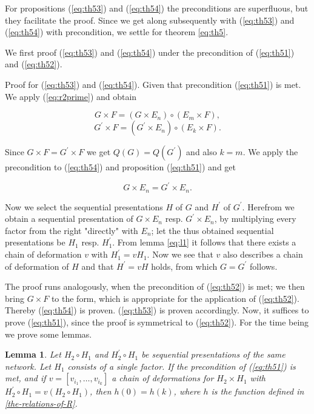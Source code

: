 \documentclass{article}
\newtheorem{lemma}{Lemma}
\begin{document}
For propositions (\ref{eq:th53}) and (\ref{eq:th54}) the preconditions are superfluous, but they facilitate the proof. Since we get along subsequently with (\ref{eq:th53}) and (\ref{eq:th54}) with precondition, we settle for theorem \ref{eq:th5}.

We first proof (\ref{eq:th53}) and (\ref{eq:th54}) under the precondition of (\ref{eq:th51}) and (\ref{eq:th52}).

Proof for (\ref{eq:th53}) and (\ref{eq:th54}). Given that precondition (\ref{eq:th51}) is met. We apply (\ref{eq:r2prime}) and obtain

\begin{equation*} G \times F = (G \times E_n) \circ (E_m \times F), \end{equation*}
\begin{equation*} G^{\prime} \times F = (G^{\prime} \times E_n) \circ (E_k \times F). \end{equation*}

Since $G \times F = G^{\prime} \times F$ we get $Q(G) = Q(G^{\prime})$ and also $k = m$. We apply the precondition to (\ref{eq:th54}) and proposition (\ref{eq:th51}) and get

\[ G \times E_n = G^{\prime} \times E_n. \]

Now we select the sequential presentations $H$ of $G$ and $H^{\prime}$ of $G^{\prime}$. 
Herefrom we obtain a sequential presentation of $G \times E_n$ resp. $G^{\prime} \times E_n$, 
by multiplying every factor from the right "directly" with $E_n$; let the thus obtained sequential presentations be $H_1$ resp. 
$H^{\prime}_1$. From lemma \ref{eq:l1} it follows that there exists a chain of deformation $v$ with $H^{\prime}_1=vH_1$.
Now we see that $v$ also describes a chain of deformation of $H$ and that $H^{\prime}=vH$ holds, from which $G = G^{\prime}$ follows.

The proof runs analogously, when the precondition of (\ref{eq:th52}) is met; 
we then bring $G \times F$ to the form, which is appropriate for the application of (\ref{eq:th52}). 
Thereby (\ref{eq:th54}) is proven. (\ref{eq:th53}) is proven accordingly. 
Now, it suffices to prove (\ref{eq:th51}), since the proof is symmetrical to (\ref{eq:th52}). 
For the time being we prove some lemmas.

\begin{lemma}
Let $H_2 \circ H_1$ and $H^{\prime}_2 \circ H_1$ be sequential presentations of the same network. Let $H_1$ consists of a single factor. 
If the precondition of (\ref{eq:th51}) is met, and if $v = [v_{i_1}, \ldots, v_{i_k}]$ a chain of deformations for $H_2 \times H_1$ with $H^{\prime}_2 \circ H_1 = v(H_2 \circ H_1)$,
then $h(0)=h(k)$, where $h$ is the function defined in \ref{the-relations-of-R}.
\end{lemma}
\end{document}
